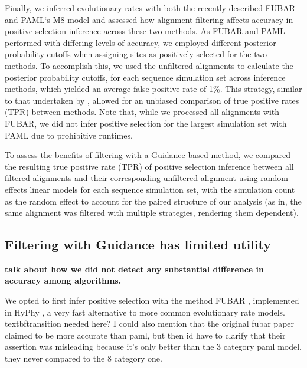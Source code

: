 \documentclass[12pt]{article}
\begin{document}
Finally, we inferred evolutionary rates with both the recently-described FUBAR \citep{Murrell2013} and PAML`s M8 model \citep{Yang2007} and assessed how alignment filtering affects accuracy in positive selection inference across these two methods. As FUBAR and PAML performed with differing levels of accuracy, we employed different posterior probability cutoffs when assigning sites as positively selected for the two methods. To accomplish this, we used the unfiltered alignments to calculate the posterior probability cutoffs, for each sequence simulation set across inference methods, which yielded an average false positive rate of 1\%. This strategy, similar to that undertaken by \citep{Jordan2011}, allowed for an unbiased comparison of true positive rates (TPR) between methods. Note that, while we processed all alignments with FUBAR, we did not infer positive selection for the largest simulation set with PAML due to prohibitive runtimes. 

To assess the benefits of filtering with a Guidance-based method, we compared the resulting true positive rate (TPR) of positive selection inference  between all filtered alignments and their corresponding unfiltered alignment using random-effects linear models for each sequence simulation set, with the simulation count as the random effect to account for the paired structure of our analysis (as in, the same alignment was filtered with multiple strategies, rendering them dependent).

\subsection*{Filtering with Guidance has limited utility}
\textbf{talk about how we did not detect any substantial difference in accuracy among algorithms.}

We opted to first infer positive selection with the method FUBAR \citep{Murrell2013}, implemented in HyPhy \citep{Pond2005}, a very fast  alternative to more common evolutionary rate models. textbf{transition needed here? I could also mention that the original fubar paper claimed to be more accurate than paml, but then id have to clarify that their assertion was misleading because it's only better than the 3 category paml model. they never compared to the 8 category one.} 


%
\end{document}
